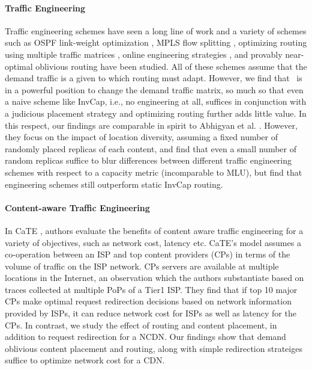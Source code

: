 {\paragraph{Traffic Engineering}  Traffic engineering schemes have seen a long line of work and a variety of schemes such as OSPF link-weight optimization \cite{fortz2000internet}, MPLS flow splitting \cite{MPLS2},  optimizing routing using multiple traffic matrices \cite{COPE, MultiTM}, online engineering strategies \cite{TEXCP,MPLS2}, and provably near-optimal oblivious routing \cite{Cohen,Racke} have been studied. All of these schemes assume that the demand traffic is a given to which routing must adapt. However, we find that \ancp\ is in a powerful position to change the demand traffic matrix, so much so that even a naive scheme like InvCap, i.e., no engineering at all, suffices in conjunction with a judicious placement strategy and optimizing routing further adds little value. In this respect, our findings are comparable in spirit to Abhigyan et al. \cite{Abhigyan}. However, they focus on the impact of location diversity, assuming a fixed number of randomly placed replicas of each content, and find that even a small number of random replicas suffice to  blur differences between different traffic engineering schemes with respect to a capacity metric (incomparable to MLU), but find that engineering schemes still outperform static InvCap routing. 


\eat
{
\paragraph{Content-aware Traffic Engineering} 

In CaTE \cite{CATE}, authors evaluate the benefits of content aware traffic engineering for a variety of objectives, such as network cost, latency etc. CaTE's model assumes a co-operation between an ISP and top content providers (CPs) in terms of the volume of traffic on the ISP network. CPs servers are available at multiple locations in the Internet, an observation which the authors substantiate based on traces collected at multiple PoPs of a Tier1 ISP.  They find that if top 10 major CPs make optimal request redirection decisions based on network information provided by ISPs, it can reduce network cost for ISPs as well as latency for the CPs.  In contrast, we study the effect of routing and content placement, in addition to request redirection for a NCDN. Our findings show that demand oblivious content placement and routing, along with simple redirection strateiges suffice to optimize network cost for a CDN. 

}}
